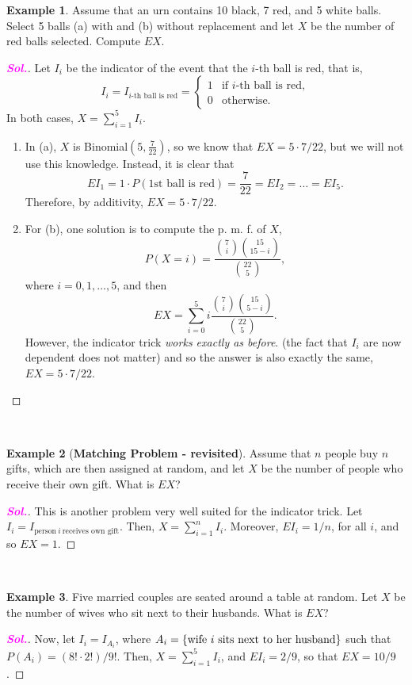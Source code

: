 \documentclass[12pt,a4paper]{article}
\theoremstyle{definition}
\newtheorem{example}{Example}[section]
\theoremstyle{definition}
\theoremstyle{definition}
\theoremstyle{definition}
\theoremstyle{remark}
\theoremstyle{definition}
\newcommand{\sol}{\textcolor{magenta}{\bf \textit{Sol.}}\quad}
\begin{document}
\begin{example}
	Assume that an urn contains 10 black, 7 red, and 5 white balls. Select 5 balls (a) with and (b) without replacement and let $X$ be the number of red balls selected. Compute $EX$.\begin{proof}[\sol]
		Let $I_i$ be the indicator of the event that the $i$-th ball is red, that is, \[
		I_i=I_{\text{$i$-th ball is red}}=\begin{cases}
		1 &\text{if $i$-th ball is red},\\
		0 &\text{otherwise}.
		\end{cases}
		\] In both cases, $X=\sum_{i=1}^{5}I_i$.\begin{enumerate}
			\item In (a), $X$ is Binomial$\left(5,\frac{7}{22}\right)$, so we know that $EX=5\cdot 7/22$, but we will not use this knowledge. Instead, it is clear that \[
			EI_1=1\cdot P(\text{1st ball is red})=\frac{7}{22}=EI_2=\dots=EI_5.
			\] Therefore, by additivity, $EX=5\cdot7/22$.
			\item For (b), one solution is to compute the p. m. f. of $X$, \[
			P(X=i)=\frac{\binom{7}{i}\binom{15}{15-i}}{\binom{22}{5}},
			\] where $i=0,1,\dots,5$, and then \[
			EX=\sum_{i=0}^5i\frac{\binom{7}{i}\binom{15}{5-i}}{\binom{22}{5}}.
			\] However, the indicator trick \textit{works exactly as before}. (the fact that $I_i$ are now dependent does not matter) and so the answer is also exactly the same, $EX=5\cdot 7/22$.
		\end{enumerate}
	\end{proof}
\end{example}
\
\begin{example}[\bf Matching Problem - revisited]
	Assume that $n$ people buy $n$ gifts, which are then assigned at random, and let $X$ be the number of people who receive their own gift. What is $EX$?\begin{proof}[\sol]
		This is another problem very well suited for the indicator trick. Let $I_i=I_{\text{person}\ i\ \text{receives own gift}}$. Then, $X=\sum_{i=1}^nI_i$. Moreover, $EI_i=1/n$, for all $i$, and so $EX=1$.
	\end{proof}
\end{example}
\
\begin{example}
	Five married couples are seated around a table at random. Let $X$ be the number of wives who sit next to their husbands. What is $EX$?\begin{proof}[\sol]
		Now, let $I_i=I_{A_i}$, where $A_i=\set{\text{wife}\ i\ \text{sits next to her husband}}$ such that $P(A_i)=(8!\cdot2!)/9!$. Then, $X=\sum_{i=1}^5I_i$, and $EI_i=2/9$, so that $EX=10/9$.
	\end{proof}
\end{example}
\begin{tcolorbox}[colback=white]
	
\end{tcolorbox}
\
\begin{tcolorbox}[colback=white]
	
\end{tcolorbox}
\end{document}
